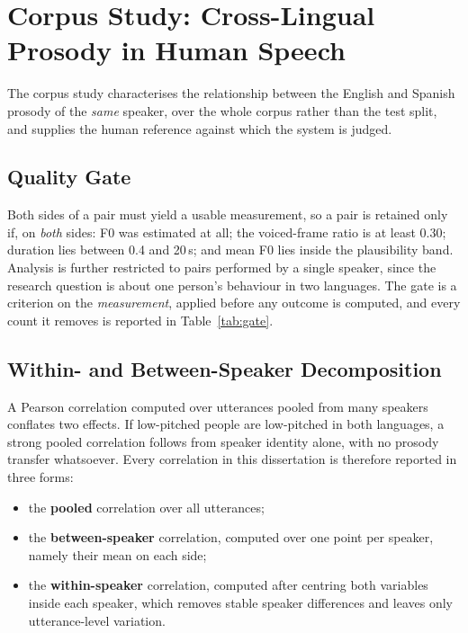 \section{Corpus Study: Cross-Lingual Prosody in Human Speech}
\label{sec:corpus_study}

The corpus study characterises the relationship between the English and Spanish prosody of the
\emph{same} speaker, over the whole corpus rather than the test split, and supplies the human
reference against which the system is judged.

\subsection{Quality Gate}
Both sides of a pair must yield a usable measurement, so a pair is retained only if, on
\emph{both} sides: F0 was estimated at all; the voiced-frame ratio is at least 0.30; duration lies
between 0.4 and 20\,s; and mean F0 lies inside the plausibility band. Analysis is further
restricted to pairs performed by a single speaker, since the research question is about one
person's behaviour in two languages. The gate is a criterion on the \emph{measurement}, applied
before any outcome is computed, and every count it removes is reported in
Table~\ref{tab:gate}.

\subsection{Within- and Between-Speaker Decomposition}
\label{sec:decomposition}
A Pearson correlation computed over utterances pooled from many speakers conflates two effects. If
low-pitched people are low-pitched in both languages, a strong pooled correlation follows from
speaker identity alone, with no prosody transfer whatsoever. Every correlation in this dissertation
is therefore reported in three forms:

\begin{itemize}
  \item the \textbf{pooled} correlation over all utterances;
  \item the \textbf{between-speaker} correlation, computed over one point per speaker, namely
        their mean on each side;
  \item the \textbf{within-speaker} correlation, computed after centring both variables inside
        each speaker, which removes stable speaker differences and leaves only utterance-level
        variation.
\end{itemize}

